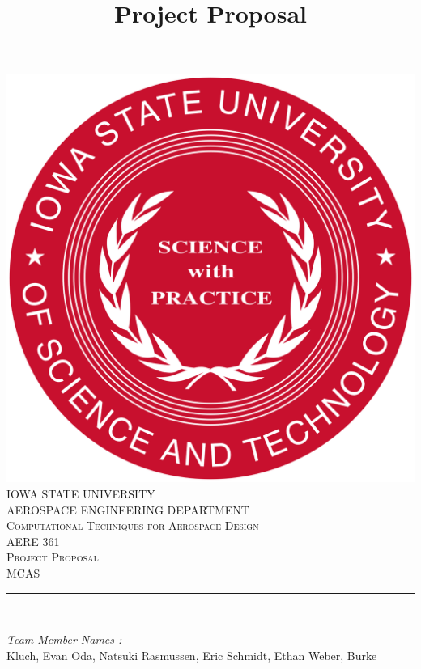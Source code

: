 \documentclass[12pt]{article}
\begin{document}
	\title{Project Proposal}
	
	\begin{titlepage}
		\centering
		\vspace*{0.5 cm}
		\includegraphics[scale = 0.11]{isu_seal.png}\\[1.0 cm]	%
		\textsc{\LARGE IOWA STATE UNIVERSITY}\\[2.0 cm]
		\textsc{\large AEROSPACE ENGINEERING DEPARTMENT}\\[0.2 cm]
		\textsc{\large Computational Techniques for Aerospace Design}\\[0.2 cm]
		\textsc{\Large AERE 361}\\[0.5 cm]				%
		\textsc{\Large Project Proposal}\\[0.2 cm]
		\textsc{\Large MCAS}\\[0.2 cm]
		\rule{\linewidth}{0.2 mm} \\[0.4 cm]
		
		
		\begin{minipage}{0.8\textwidth}
			
			\begin{flushleft} 
				\emph{Team Member Names :} \\
				Kluch, Evan\linebreak
				Oda, Natsuki\linebreak
				Rasmussen, Eric\linebreak
				Schmidt, Ethan\linebreak
				Weber, Burke\linebreak
				
			\end{flushleft}
		\end{minipage}\\[2 cm]
		
		\vfill
		
	\end{titlepage}
	
\end{document}
